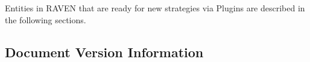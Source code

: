 \documentclass[pdf,12pt]{INLreport}
\begin{document}




    \SANDmain		%








Entities in RAVEN that are ready for new strategies via Plugins are
described in the following sections.







\clearpage
\begin{appendices}
  \section{Document Version Information}
  
\end{appendices}
%


    \clearpage
    \providecommand*{\phantomsection}{}
    \phantomsection
    
    




\end{document}
